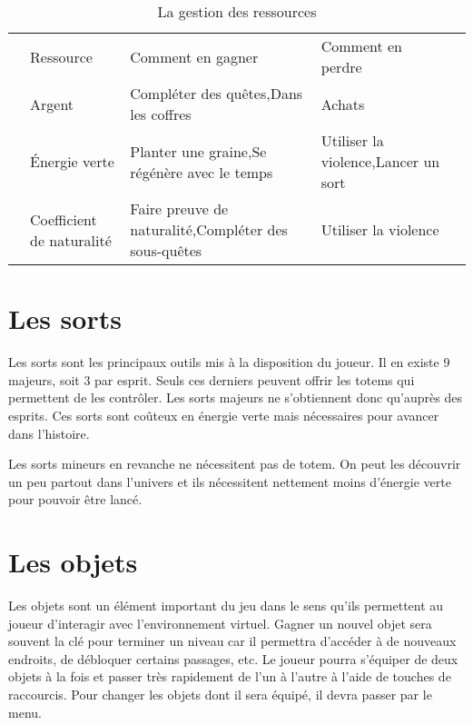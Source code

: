 \begin{table}[ht!]
	\begin{tabu} to \textwidth {l X X[1.2] X[1.2] l}
		\rowfont{\bfseries\sffamily\leavevmode\color{white}}
		& Ressource & Comment en gagner & Comment en perdre & \\
		& Argent & Compléter des quêtes,\newline Dans les coffres & Achats & \\
		& Énergie verte & Planter une graine,\newline Se régénère avec le temps & Utiliser la violence,\newline Lancer un sort & \\
		& Coefficient de naturalité & Faire preuve de naturalité,\newline Compléter des sous-quêtes & Utiliser la violence & \\
	\end{tabu}
	\caption{La gestion des ressources}
\end{table}

\section{Les sorts}
\label{sec:sorts}
Les sorts sont les principaux outils mis à la disposition du joueur. Il en existe 9 majeurs, soit 3 par esprit. Seuls ces derniers peuvent offrir les totems qui permettent de les contrôler. Les sorts majeurs ne s'obtiennent donc qu'auprès des esprits. Ces sorts sont coûteux en énergie verte mais nécessaires pour avancer dans l'histoire.

Les sorts mineurs en revanche ne nécessitent pas de totem. On peut les découvrir un peu partout dans l'univers et ils nécessitent nettement moins d'énergie verte pour pouvoir être lancé.


\section{Les objets}
Les objets sont un élément important du jeu dans le sens qu'ils permettent au joueur d'interagir avec l'environnement virtuel. Gagner un nouvel objet sera souvent la clé pour terminer un niveau car il permettra d'accéder à de nouveaux endroits, de débloquer certains passages, etc. Le joueur pourra s'équiper de deux objets à la fois et passer très rapidement de l'un à l'autre à l'aide de touches de raccourcis. Pour changer les objets dont il sera équipé, il devra passer par le menu.

